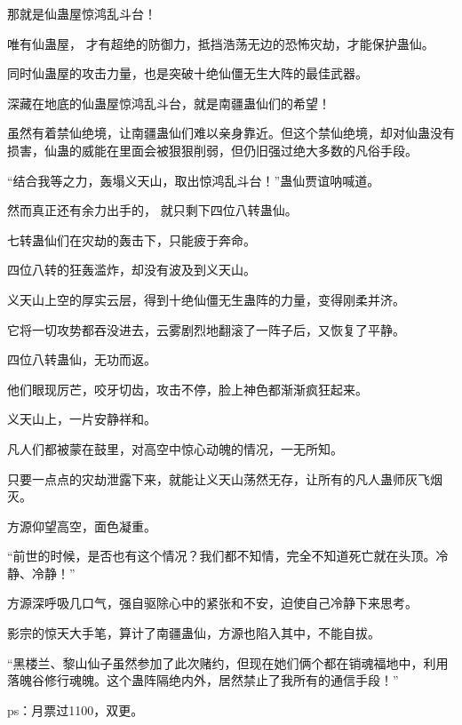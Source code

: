 \begin{this_body}
那就是仙蛊屋惊鸿乱斗台！

唯有仙蛊屋， 才有超绝的防御力，抵挡浩荡无边的恐怖灾劫，才能保护蛊仙。

同时仙蛊屋的攻击力量，也是突破十绝仙僵无生大阵的最佳武器。

深藏在地底的仙蛊屋惊鸿乱斗台，就是南疆蛊仙们的希望！

虽然有着禁仙绝境，让南疆蛊仙们难以亲身靠近。但这个禁仙绝境，却对仙蛊没有损害，仙蛊的威能在里面会被狠狠削弱，但仍旧强过绝大多数的凡俗手段。

“结合我等之力，轰塌义天山，取出惊鸿乱斗台！”蛊仙贾谊呐喊道。

然而真正还有余力出手的， 就只剩下四位八转蛊仙。

七转蛊仙们在灾劫的轰击下，只能疲于奔命。

四位八转的狂轰滥炸，却没有波及到义天山。

义天山上空的厚实云层，得到十绝仙僵无生蛊阵的力量，变得刚柔并济。

它将一切攻势都吞没进去，云雾剧烈地翻滚了一阵子后，又恢复了平静。

四位八转蛊仙，无功而返。

他们眼现厉芒，咬牙切齿，攻击不停，脸上神色都渐渐疯狂起来。

义天山上，一片安静祥和。

凡人们都被蒙在鼓里，对高空中惊心动魄的情况，一无所知。

只要一点点的灾劫泄露下来，就能让义天山荡然无存，让所有的凡人蛊师灰飞烟灭。

方源仰望高空，面色凝重。

“前世的时候，是否也有这个情况？我们都不知情，完全不知道死亡就在头顶。冷静、冷静！”

方源深呼吸几口气，强自驱除心中的紧张和不安，迫使自己冷静下来思考。

影宗的惊天大手笔，算计了南疆蛊仙，方源也陷入其中，不能自拔。

“黑楼兰、黎山仙子虽然参加了此次赌约，但现在她们俩个都在销魂福地中，利用落魄谷修行魂魄。这个蛊阵隔绝内外，居然禁止了我所有的通信手段！”

ps：月票过1100，双更。

\end{this_body}

